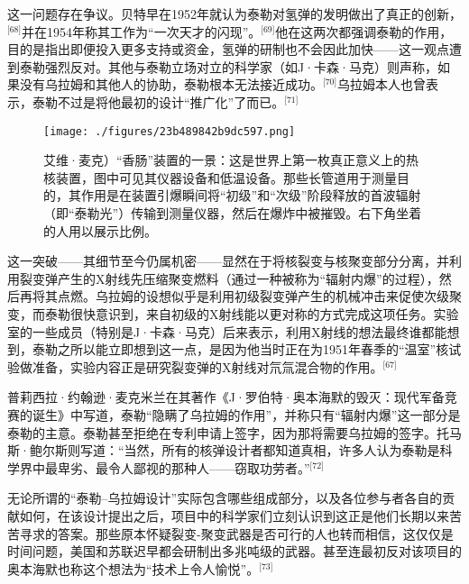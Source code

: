 这一问题存在争议。贝特早在1952年就认为泰勒对氢弹的发明做出了真正的创新，\(^\text{[68]}\)并在1954年称其工作为“一次天才的闪现”。\(^\text{[69]}\)他在这两次都强调泰勒的作用，目的是指出即便投入更多支持或资金，氢弹的研制也不会因此加快——这一观点遭到泰勒强烈反对。其他与泰勒立场对立的科学家（如J·卡森·马克）则声称，如果没有乌拉姆和其他人的协助，泰勒根本无法接近成功。\(^\text{[70]}\)乌拉姆本人也曾表示，泰勒不过是将他最初的设计“推广化”了而已。\(^\text{[71]}\)
\begin{figure}[ht]
\centering
\texttt{[image: ./figures/23b489842b9dc597.png]}
\caption{艾维·麦克）“香肠”装置的一景：这是世界上第一枚真正意义上的热核装置，图中可见其仪器设备和低温设备。那些长管道用于测量目的，其作用是在装置引爆瞬间将“初级”和“次级”阶段释放的首波辐射（即“泰勒光”）传输到测量仪器，然后在爆炸中被摧毁。右下角坐着的人用以展示比例。} \label{fig_ADHTL_8}
\end{figure}
这一突破——其细节至今仍属机密——显然在于将核裂变与核聚变部分分离，并利用裂变弹产生的X射线先压缩聚变燃料（通过一种被称为“辐射内爆”的过程），然后再将其点燃。乌拉姆的设想似乎是利用初级裂变弹产生的机械冲击来促使次级聚变，而泰勒很快意识到，来自初级的X射线能以更对称的方式完成这项任务。实验室的一些成员（特别是J·卡森·马克）后来表示，利用X射线的想法最终谁都能想到，泰勒之所以能立即想到这一点，是因为他当时正在为1951年春季的“温室”核试验做准备，实验内容正是研究裂变弹的X射线对氘氚混合物的作用。\(^\text{[67]}\)

普莉西拉·约翰逊·麦克米兰在其著作《J·罗伯特·奥本海默的毁灭：现代军备竞赛的诞生》中写道，泰勒“隐瞒了乌拉姆的作用”，并称只有“辐射内爆”这一部分是泰勒的主意。泰勒甚至拒绝在专利申请上签字，因为那将需要乌拉姆的签字。托马斯·鲍尔斯则写道：“当然，所有的核弹设计者都知道真相，许多人认为泰勒是科学界中最卑劣、最令人鄙视的那种人——窃取功劳者。”\(^\text{[72]}\)

无论所谓的“泰勒–乌拉姆设计”实际包含哪些组成部分，以及各位参与者各自的贡献如何，在该设计提出之后，项目中的科学家们立刻认识到这正是他们长期以来苦苦寻求的答案。那些原本怀疑裂变-聚变武器是否可行的人也转而相信，这仅仅是时间问题，美国和苏联迟早都会研制出多兆吨级的武器。甚至连最初反对该项目的奥本海默也称这个想法为“技术上令人愉悦”。\(^\text{[73]}\)
